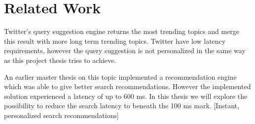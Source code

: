 \chapter{Related Work}
Twitter’s query suggestion engine returns the most trending topics and merge this result with more long term trending topics.
Twitter have low latency requirements, however the query suggestion is not personalized in the same way as this project thesis tries to achieve.

An earlier master thesis on this topic implemented a recommendation engine which was able to give better search recommendations.
However the implemented solution experienced a latency of up to 600 ms.
In this thesis we will explore the possibility to reduce the search latency to beneath the 100 ms mark. [Instant, personalized search recommendations]
